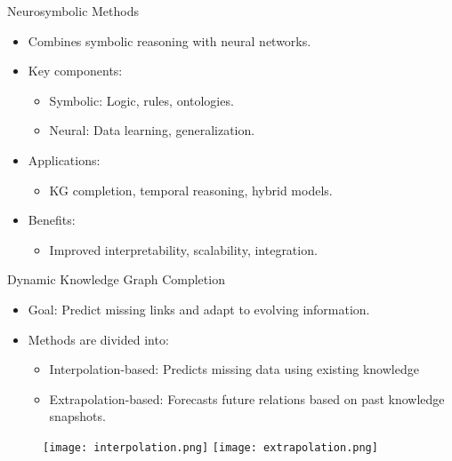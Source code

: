\documentclass{beamer}
\begin{document}
    \begin{frame}{Neurosymbolic Methods}
        \begin{itemize}
            \item Combines symbolic reasoning with neural networks.
            \item Key components: 
            \begin{itemize}
                \item Symbolic: Logic, rules, ontologies.
                \item Neural: Data learning, generalization.
        \end{itemize}
        \item Applications: 
        \begin{itemize}
            \item KG completion, temporal reasoning, hybrid models.
        \end{itemize}
        \item Benefits: 
        \begin{itemize}
            \item Improved interpretability, scalability, integration.
        \end{itemize}
        \end{itemize}
    \end{frame}

    \begin{frame}{Dynamic Knowledge Graph Completion}
        \begin{itemize}
            \item Goal: Predict missing links and adapt to evolving information.
            \item Methods are divided into:
                \begin{itemize}
                    \item Interpolation-based: Predicts missing data using existing knowledge
                    \item Extrapolation-based: Forecasts future relations based on past knowledge snapshots.
                \end{itemize}
        \end{itemize}
        \begin{figure}[h!]
            \centering
            \texttt{[image: interpolation.png]}
            \texttt{[image: extrapolation.png]}
        \end{figure}
    \end{frame}
\end{document}

